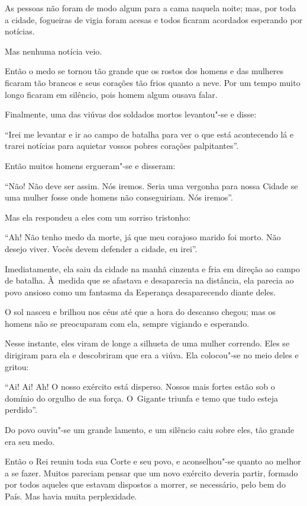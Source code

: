 As pessoas não foram de modo algum para a cama naquela noite; mas, por
toda a cidade, fogueiras de vigia foram acesas e todos ficaram acordados
esperando por notícias.

Mas nenhuma notícia veio.

Então o medo se tornou tão grande que os rostos dos homens e das
mulheres ficaram tão brancos e seus corações tão frios quanto a neve.
Por um tempo muito longo ficaram em silêncio, pois homem algum ousava
falar.

Finalmente, uma das viúvas dos soldados mortos levantou"-se e disse:

``Irei me levantar e ir ao campo de batalha para ver o que está
acontecendo lá e trarei notícias para aquietar vossos pobres corações
palpitantes''.

Então muitos homens ergueram"-se e disseram:

``Não! Não deve ser assim. Nós iremos. Seria uma vergonha para nossa
Cidade se uma mulher fosse onde homens não conseguiriam. Nós iremos''.

Mas ela respondeu a eles com um sorriso tristonho:

``Ah! Não tenho medo da morte, já que meu corajoso marido foi morto. Não
desejo viver. Vocês devem defender a cidade, eu irei''.

Imediatamente, ela saiu da cidade na manhã cinzenta e fria em direção ao
campo de batalha. À~medida que se afastava e desaparecia na distância,
ela parecia ao povo ansioso como um fantasma da Esperança desaparecendo
diante deles.

O sol nasceu e brilhou nos céus até que a hora do descanso chegou; mas
os homens não se preocuparam com ela, sempre vigiando e esperando.

Nesse instante, eles viram de longe a silhueta de uma mulher correndo.
Eles se dirigiram para ela e descobriram que era a viúva. Ela colocou"-se
no meio deles e gritou:

``Ai! Ai! Ah! O nosso exército está disperso. Nossos mais fortes estão
sob o domínio do orgulho de sua força. O~Gigante triunfa e temo que tudo
esteja perdido''.

Do povo ouviu"-se um grande lamento, e um silêncio caiu sobre eles, tão
grande era seu medo.

Então o Rei reuniu toda sua Corte e seu povo, e aconselhou"-se quanto ao
melhor a se fazer. Muitos pareciam pensar que um novo exército deveria
partir, formado por todos aqueles que estavam dispostos a morrer, se
necessário, pelo bem do País. Mas havia muita perplexidade.

